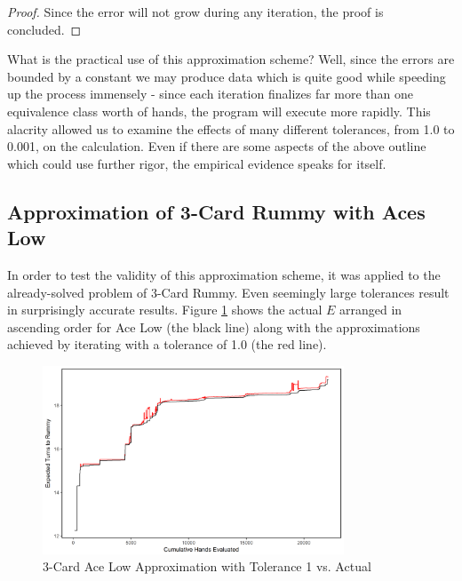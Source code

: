 \documentclass[letter,12pt]{article}
\begin{document}
\begin{proof}
Since the error will not grow during any iteration, the proof is concluded.
\end{proof}

What is the practical use of this approximation scheme? Well, since the errors are bounded by a constant we may produce data which is quite good while speeding up the process immensely - since each iteration finalizes far more than one equivalence class worth of hands, the program will execute more rapidly. This alacrity allowed us to examine the effects of many different tolerances, from 1.0 to 0.001, on the calculation. Even if there are some aspects of the above outline which could use further rigor, the empirical evidence speaks for itself.
 
\subsection{Approximation of 3-Card Rummy with Aces Low}

In order to test the validity of this approximation scheme, it was applied to the already-solved problem of 3-Card Rummy. Even seemingly large tolerances result in surprisingly accurate results. Figure \ref{fig:4} shows the actual $E$ arranged in ascending order for Ace Low (the black line) along with the approximations achieved by iterating with a tolerance of 1.0 (the red line).

\begin{figure}
\centering
\includegraphics[width=0.8\textwidth]{fig4.png}
\caption{3-Card Ace Low Approximation with Tolerance 1 vs. Actual}\label{fig:4}
\end{figure}
\end{document}
